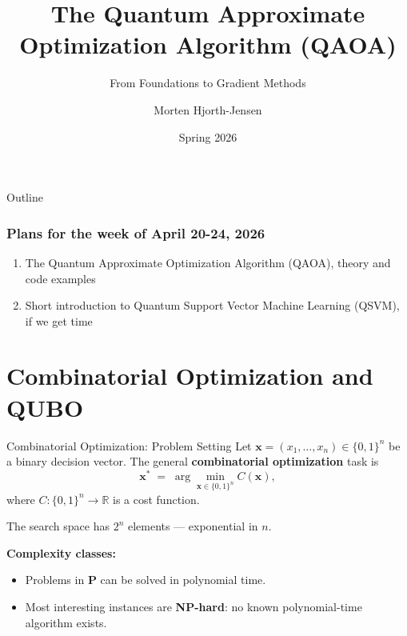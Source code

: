 \documentclass{beamer}
\title{The Quantum Approximate Optimization Algorithm (QAOA)}
\subtitle{From Foundations to Gradient Methods}
\author{Morten Hjorth-Jensen}
\date{Spring 2026}
\begin{document}
\frame{\titlepage}

\begin{frame}{Outline}
\tableofcontents
\end{frame}


\begin{frame}
\frametitle{Plans for the week of April 20-24, 2026}

\begin{block}{}
\begin{enumerate}
 \item The Quantum Approximate Optimization Algorithm (QAOA), theory and code examples
 \item Short introduction to Quantum Support Vector Machine Learning (QSVM), if we get time


\end{enumerate}

\noindent
\end{block}


\section{Combinatorial Optimization and QUBO}

\begin{frame}{Combinatorial Optimization: Problem Setting}
Let $\mathbf{x} = (x_1,\dots,x_n)\in\{0,1\}^n$ be a binary decision
vector. The general \textbf{combinatorial optimization} task is
\[
\mathbf{x}^* \;=\; \arg\min_{\mathbf{x}\in\{0,1\}^n} C(\mathbf{x}),
\]
where $C:\{0,1\}^n\to\mathbb{R}$ is a cost function.

\medskip

The search space has $2^n$ elements — exponential in $n$.

\medskip

\textbf{Complexity classes:}
\begin{itemize}
\item Problems in \textbf{P} can be solved in polynomial time.
\item Most interesting instances are \textbf{NP-hard}: no known
  polynomial-time algorithm exists.
\end{itemize}


\end{frame}
\end{frame}
\end{document}
